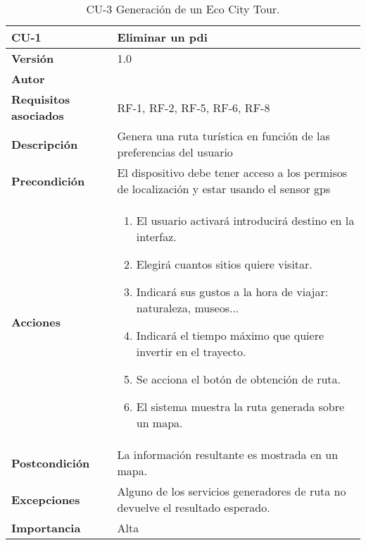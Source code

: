 \begin{table}[p]
	\centering
	\begin{tabularx}{\linewidth}{ p{} p{} }
		\toprule
		\textbf{CU-1}    & \textbf{Eliminar un \acrlong{pdi}}\\
		\toprule
		\textbf{Versión}              & 1.0    \\
		\textbf{Autor}                & \autor \\
		\textbf{Requisitos asociados} & RF-1, RF-2, RF-5, RF-6, RF-8 \\
		\textbf{Descripción}          & Genera una ruta turística en función de las preferencias del usuario \\
		\textbf{Precondición}         & El dispositivo debe tener acceso a los permisos de localización y estar usando el sensor \acrshort{gps} \\
		\textbf{Acciones}             &
		\begin{enumerate}
			\def\labelenumi{\arabic{enumi}.}
			\tightlist
			\item El usuario activará introducirá destino en la interfaz.
			\item Elegirá cuantos sitios quiere visitar.
			\item Indicará sus gustos a la hora de viajar: naturaleza, museos...
			\item Indicará el tiempo máximo que quiere invertir en el trayecto.
			\item Se acciona el botón de obtención de ruta.
			\item El sistema muestra la ruta generada sobre un mapa.
		\end{enumerate}\\
		\textbf{Postcondición}        & La información resultante es mostrada en un mapa. \\
		\textbf{Excepciones}          & Alguno de los servicios generadores de ruta no devuelve el resultado esperado. \\
		\textbf{Importancia}          & Alta \\
		\bottomrule
	\end{tabularx}
	\caption{CU-3 Generación de un Eco City Tour.}
\end{table}



